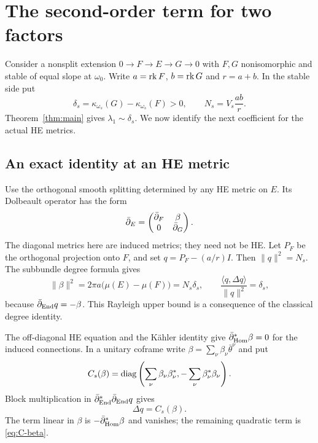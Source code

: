 \section{The second-order term for two factors}
\label{sec:two-factor}

Consider a nonsplit extension $0\to F\to E\to G\to0$ with
$F,G$ nonisomorphic and stable of equal slope at $\omega_0$.
Write $a=\operatorname{rk} F$, $b=\operatorname{rk} G$ and $r=a+b$. In the stable side put
\[
 \delta_s=\kappa_{\omega_s}(G)-\kappa_{\omega_s}(F)>0,
 \qquad N_s=V_s\frac{ab}{r}.
\]
Theorem~\ref{thm:main} gives $\lambda_1\sim\delta_s$.
We now identify the next coefficient for the actual HE metrics.

\subsection{An exact identity at an HE metric}
Use the orthogonal smooth splitting determined by any HE metric on
$E$. Its Dolbeault operator has the form
\[
 \bar\partial_E=\begin{pmatrix}\bar\partial_F&\beta\\0&\bar\partial_G\end{pmatrix}.
\]
The diagonal metrics here are induced metrics; they need not be HE.
Let $P_F$ be the orthogonal projection onto $F$, and set
$q=P_F-(a/r)I$. Then $\|q\|^2=N_s$. The subbundle degree formula
gives
\begin{equation}\label{eq:exact-rayleigh}
 \|\beta\|^2=2\pi a\bigl(\mu(E)-\mu(F)\bigr)
             =N_s\delta_s,
 \qquad \frac{\langle q,\Delta q\rangle}{\|q\|^2}=\delta_s,
\end{equation}
because $\bar\partial_{\operatorname{End}}q=-\beta$. This Rayleigh upper bound is a
consequence of the classical degree identity.

The off-diagonal HE equation and the K\"ahler identity give
$\bar\partial_{\operatorname{Hom}}^*\beta=0$ for the induced connections. In a unitary
coframe write $\beta=\sum_\nu\beta_\nu\bar\theta^\nu$ and put
\begin{equation}\label{eq:C-beta}
 C_s(\beta)=\operatorname{diag}\left(\sum_\nu\beta_\nu\beta_\nu^*,
                       -\sum_\nu\beta_\nu^*\beta_\nu\right).
\end{equation}
Block multiplication in $\bar\partial_{\operatorname{End}}^*\bar\partial_{\operatorname{End}}q$ gives
\begin{equation}\label{eq:Delta-q}
 \Delta q=C_s(\beta).
\end{equation}
The term linear in $\beta$ is $-\bar\partial_{\operatorname{Hom}}^*\beta$ and vanishes;
the remaining quadratic term is \eqref{eq:C-beta}.

